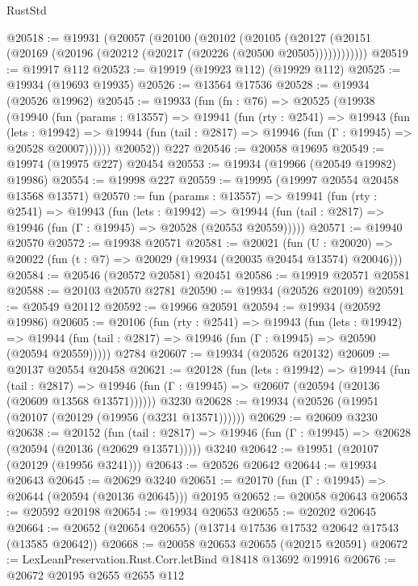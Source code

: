 \begin{lexlean}{RustStd}
\begin{coremodule}
@20518 := @19931
    (@20057
      (@20100
        (@20102
          (@20105 (@20127 (@20151 (@20169 (@20196 (@20212 (@20217 (@20226 (@20500 @20505))))))))))))
@20519 := @19917 @112
@20523 := @19919 (@19923 @112) (@19929 @112)
@20525 := @19934 (@19693 @19935)
@20526 := @13564 @17536
@20528 := @19934 (@20526 @19962)
@20545 := @19933
    (fun (fn : @76) =>
    @20525
      (@19938
        (@19940
          (fun (params : @13557) =>
          @19941
            (fun (rty : @2541) =>
            @19943
              (fun (lets : @19942) =>
              @19944 (fun (tail : @2817) => @19946 (fun (Γ : @19945) => @20528 @20007))))))
        @20052))
    @227
@20546 := @20058 @19695
@20549 := @19974 (@19975 @227) @20454
@20553 := @19934 (@19966 (@20549 @19982) @19986)
@20554 := @19998 @227
@20559 := @19995 (@19997 @20554 @20458 @13568 @13571)
@20570 := fun (params : @13557) =>
  @19941
    (fun (rty : @2541) =>
    @19943
      (fun (lets : @19942) =>
      @19944 (fun (tail : @2817) => @19946 (fun (Γ : @19945) => @20528 (@20553 @20559)))))
@20571 := @19940 @20570
@20572 := @19938 @20571
@20581 := @20021
    (fun (U : @20020) => @20022 (fun (t : @7) => @20029 (@19934 (@20035 @20454 @13574) @20046)))
@20584 := @20546 (@20572 @20581) @20451
@20586 := @19919 @20571 @20581
@20588 := @20103 @20570 @2781
@20590 := @19934 (@20526 @20109)
@20591 := @20549 @20112
@20592 := @19966 @20591
@20594 := @19934 (@20592 @19986)
@20605 := @20106
    (fun (rty : @2541) =>
    @19943
      (fun (lets : @19942) =>
      @19944 (fun (tail : @2817) => @19946 (fun (Γ : @19945) => @20590 (@20594 @20559)))))
    @2784
@20607 := @19934 (@20526 @20132)
@20609 := @20137 @20554 @20458
@20621 := @20128
    (fun (lets : @19942) =>
    @19944
      (fun (tail : @2817) =>
      @19946 (fun (Γ : @19945) => @20607 (@20594 (@20136 (@20609 @13568 @13571))))))
    @3230
@20628 := @19934 (@20526 (@19951 (@20107 (@20129 (@19956 (@3231 @13571))))))
@20629 := @20609 @3230
@20638 := @20152
    (fun (tail : @2817) => @19946 (fun (Γ : @19945) => @20628 (@20594 (@20136 (@20629 @13571)))))
    @3240
@20642 := @19951 (@20107 (@20129 (@19956 @3241)))
@20643 := @20526 @20642
@20644 := @19934 @20643
@20645 := @20629 @3240
@20651 := @20170 (fun (Γ : @19945) => @20644 (@20594 (@20136 @20645))) @20195
@20652 := @20058 @20643
@20653 := @20592 @20198
@20654 := @19934 @20653
@20655 := @20202 @20645
@20664 := @20652 (@20654 @20655) (@13714 @17536 @17532 @20642 @17543 (@13585 @20642))
@20668 := @20058 @20653 @20655 (@20215 @20591)
@20672 := LexLeanPreservation.Rust.Corr.letBind @18418 @13692 @19916
@20676 := @20672 @20195 @2655 @2655 @112

\end{coremodule}
\end{lexlean}
